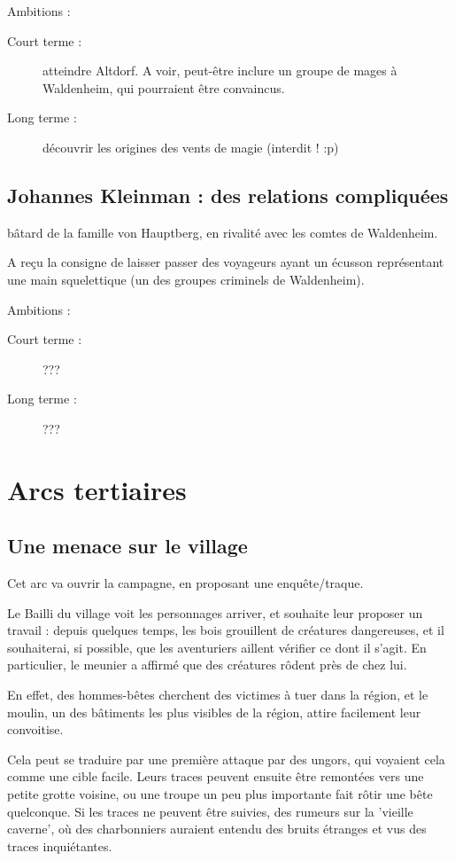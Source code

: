 \documentclass[10pt,a4paper]{book}
\begin{document}
Ambitions :
\begin{description}
\item[Court terme :]atteindre Altdorf. A voir, peut-être inclure un groupe de mages à Waldenheim, qui pourraient être convaincus.
\item[Long terme :]découvrir les origines des vents de magie (interdit ! :p)
\end{description}
\subsection{Johannes Kleinman : des relations compliquées}
bâtard de la famille von Hauptberg, en rivalité avec les comtes de Waldenheim.

A reçu la consigne de laisser passer des voyageurs ayant un écusson représentant une main squelettique (un des groupes criminels de Waldenheim).

Ambitions :
\begin{description}
\item[Court terme :]???
\item[Long terme :]???
\end{description}
\section{Arcs tertiaires}
\subsection{Une menace sur le village}
Cet arc va ouvrir la campagne, en proposant une enquête/traque.

Le Bailli du village voit les personnages arriver, et souhaite leur proposer un travail : depuis quelques temps, les bois grouillent de créatures dangereuses, et il souhaiterai, si possible, que les aventuriers aillent vérifier ce dont il s'agit. En particulier, le meunier a affirmé que des créatures rôdent près de chez lui.

En effet, des hommes-bêtes cherchent des victimes à tuer dans la région, et le moulin, un des bâtiments les plus visibles de la région, attire facilement leur convoitise.

Cela peut se traduire par une première attaque par des ungors, qui voyaient cela comme une cible facile. Leurs traces peuvent ensuite être remontées vers une petite grotte voisine, ou une troupe un peu plus importante fait rôtir une bête quelconque. Si les traces ne peuvent être suivies, des rumeurs sur la 'vieille caverne', où des charbonniers auraient entendu des bruits étranges et vus des traces inquiétantes.
\end{document}
